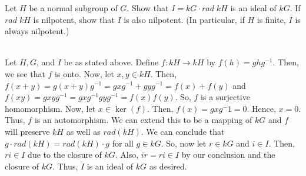 Let $H$ be a normal subgroup of $G$. Show that $I=kG\cdot rad\;kH$ is an ideal of $kG$. If
$rad\;kH$ is nilpotent, show that $I$ is also nilpotent. (In particular, if $H$ is finite, $I$ is always
nilpotent.)\\

\begin{solution}\renewcommand{\qedsymbol}{}\ \\
    Let $H, G$, and $I$ be as stated above. Define $f:kH\rightarrow kH$ by $f(h)=ghg^{-1}$. Then, we see
    that $f$ is onto. Now, let $x,y\in kH$. Then, $f(x+y)=g(x+y)g^{-1}=gxg^{-1}+gyg^{-1}=f(x)+f(y)$ and
    $f(xy)=gxyg^{-1}=gxg^{-1}gyg^{-1}=f(x)f(y)$. So, $f$ is a surjective homomorphism. Now, let
    $x\in\ker(f)$. Then, $f(x)=gxg^-1=0$. Hence, $x=0$. Thus, $f$ is an automorphism. We can extend this
    to be a mapping of $kG$ and $f$ will preserve $kH$ as well as $rad(kH)$. We can conclude that
    $g\cdot rad(kH)=rad(kH)\cdot g$ for all $g\in kG$. So, now let $r\in kG$ and $i\in I$. Then,
    $ri\in I$ due to the closure of $kG$. Also, $ir=ri\in I$ by our conclusion and the closure of $kG$.
    Thus, $I$ is an ideal of $kG$ as desired. 

\end{solution}